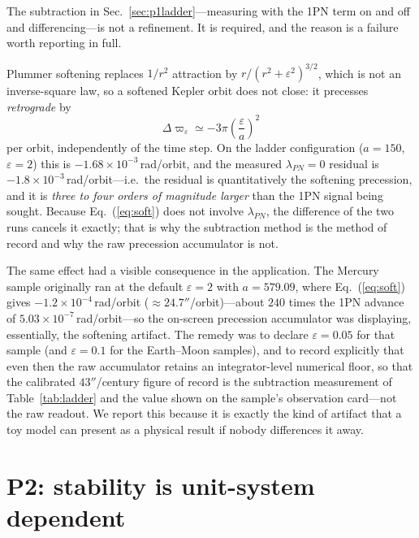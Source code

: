 \documentclass[aps,reprint,amsmath,amssymb,nofootinbib,superscriptaddress,floatfix]{revtex4-2}
\begin{document}
The subtraction in Sec.~\ref{sec:p1ladder}---measuring with the 1PN
term on and off and differencing---is not a refinement.
It is required, and the reason is a failure worth reporting in full.

Plummer softening replaces $1/r^{2}$ attraction by
$r/(r^{2}+\varepsilon^{2})^{3/2}$, which is not an inverse-square law,
so a softened Kepler orbit does not close: it precesses
\emph{retrograde} by
\begin{equation}
  \Delta\varpi_{\varepsilon} \simeq -3\pi\left(\frac{\varepsilon}{a}
  \right)^{2}
  \label{eq:soft}
\end{equation}
per orbit, independently of the time step.
On the ladder configuration ($a=150$, $\varepsilon=2$) this is
$-1.68\times10^{-3}$\,rad/orbit, and the measured
$\lambda_{PN}=0$ residual is $-1.8\times10^{-3}$\,rad/orbit---i.e.\ the
residual is quantitatively the softening precession, and it is
\emph{three to four orders of magnitude larger} than the 1PN signal
being sought.
Because Eq.~(\ref{eq:soft}) does not involve $\lambda_{PN}$, the
difference of the two runs cancels it exactly; that is why the
subtraction method is the method of record and why the raw
precession accumulator is not.

The same effect had a visible consequence in the application.
The Mercury sample originally ran at the default $\varepsilon=2$ with
$a=579.09$, where Eq.~(\ref{eq:soft}) gives
$-1.2\times10^{-4}$\,rad/orbit ($\approx24.7''$/orbit)---about $240$
times the 1PN advance of $5.03\times10^{-7}$\,rad/orbit---so the
on-screen precession accumulator was displaying, essentially, the
softening artifact.
The remedy was to declare $\varepsilon=0.05$ for that sample (and
$\varepsilon=0.1$ for the Earth--Moon samples), and to record
explicitly that even then the raw accumulator retains an
integrator-level numerical floor, so that the calibrated
$43''$/century figure of record is the subtraction measurement of
Table~\ref{tab:ladder} and the value shown on the sample's observation
card---not the raw readout.
We report this because it is exactly the kind of artifact that a toy
model can present as a physical result if nobody differences it away.

\section{P2: stability is unit-system dependent}
\label{sec:p2}
\end{document}
